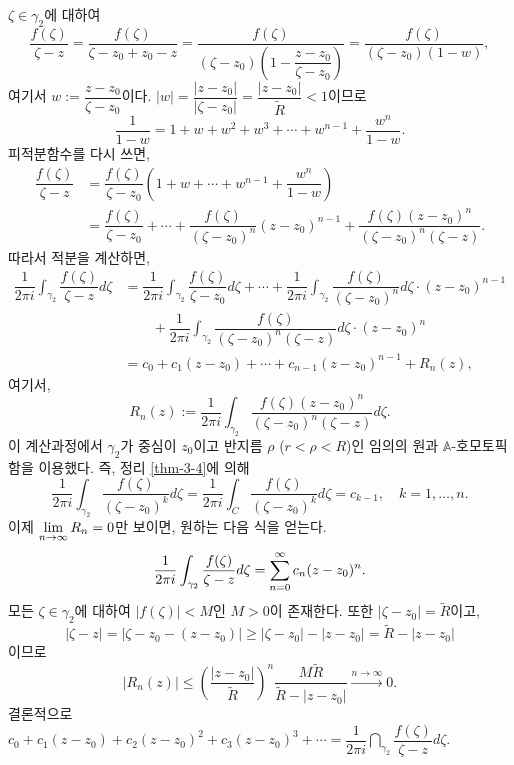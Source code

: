 $\zeta \in \gamma_2$에 대하여
\[
\dfrac{f(\zeta)}{\zeta-z} = \dfrac{f(\zeta)}{\zeta-z_0+z_0-z}
= \dfrac{f(\zeta)}{(\zeta-z_0)\left(1 - \dfrac{z-z_0}{\zeta- z_0}\right)}
= \dfrac{f(\zeta)}{(\zeta-z_0)(1-w)},
\]
여기서 $w:= \dfrac{z-z_0}{\zeta- z_0}$이다.
$|w| = \dfrac{|z-z_0|}{|\zeta- z_0|} = \dfrac{|z-z_0|}{\tilde R} < 1$이므로
\[
\dfrac1{1-w} = 1+ w + w^2 + w^3 + \cdots + w^{n-1} + \dfrac{w^n}{1-w}.
\]
피적분함수를 다시 쓰면,
\begin{align*}
\dfrac{f(\zeta)}{\zeta-z} &= \dfrac{f(\zeta)}{\zeta-z_0} \left(
1+ w + \cdots + w^{n-1} + \dfrac{w^n}{1-w} \right) \\
&= \dfrac{f(\zeta)}{\zeta-z_0} + \cdots + \dfrac{f(\zeta)}{(\zeta-z_0)^n}(z-z_0)^{n-1}
+ \dfrac{f(\zeta)(z-z_0)^n}{(\zeta-z_0)^n(\zeta-z)}.
\end{align*}
따라서 적분을 계산하면,
\begin{align*}
\dfrac1{2\pi i} \int_{\gamma_2} \dfrac{f(\zeta)}{\zeta-z} d\zeta
&= \dfrac1{2\pi i} \int_{\gamma_2} \dfrac{f(\zeta)}{\zeta-z_0} d\zeta
+ \cdots + \dfrac1{2\pi i} \int_{\gamma_2} \dfrac{f(\zeta)}{(\zeta-z_0)^n} d\zeta 
\cdot (z-z_0)^{n-1} \\
& \quad\quad + \dfrac1{2\pi i} \int_{\gamma_2} \dfrac{f(\zeta)}{(\zeta-z_0)^n(\zeta-z)} d\zeta
\cdot (z-z_0)^{n}  \\
&= c_0 + c_1(z-z_0) + \cdots + c_{n-1}(z-z_0)^{n-1} + R_n(z),
\end{align*}
여기서, 
\[
R_n(z) := \dfrac1{2\pi i} \int_{\gamma_2} \dfrac{f(\zeta)(z-z_0)^n}{(\zeta-z_0)^n(\zeta-z)} d\zeta.
\]
이 계산과정에서 $\gamma_2$가 중심이 $z_0$이고 반지름 $\rho$ ($r<\rho<R$)인
임의의 원과 $\mathbb A$-호모토픽함을 이용했다.
즉, 정리 \ref{thm-3-4}에 의해
\[
\dfrac1{2\pi i} \int_{\gamma_2} \dfrac{f(\zeta)}{(\zeta-z_0)^k} d\zeta
= \dfrac1{2\pi i} \int_{C} \dfrac{f(\zeta)}{(\zeta-z_0)^k} d\zeta
= c_{k-1},
\quad k=1,\ldots, n.
\]
이제 
$\lim\limits_{n\to\infty} R_n = 0$만 보이면,
원하는 다음 식을 얻는다.
\[
\displaystyle\frac1{2\pi i} \displaystyle\int_{\gamma_2} \displaystyle\frac{f(\zeta)}{\zeta-z}d\zeta
= \sum\limits_{n=0}^\infty c_n(z-z_0)^n.
\]
모든 $\zeta \in \gamma_2$에 대하여 $|f(\zeta)| <M$인 $M>0$이 존재한다.
또한 $|\zeta - z_0| = \tilde R$이고,
\[
|\zeta - z| = |\zeta - z_0 - (z-z_0) | \ge
|\zeta - z_0| - |z-z_0| = \tilde R - |z-z_0|
\]
이므로 
\[
|R_n(z)| \le \left( \dfrac{|z-z_0|}{\tilde R} \right)^n
\dfrac{M\tilde R}{\tilde R - |z-z_0|} 
\xrightarrow{n\to\infty} 0.
\]
결론적으로 
$c_0 + c_1(z-z_0) + c_2(z-z_0)^2 + c_3(z-z_0)^3 + \cdots
= \dfrac1{2\pi i } \dint_{\gamma_2} \dfrac{f(\zeta)}{\zeta-z}d\zeta$.


